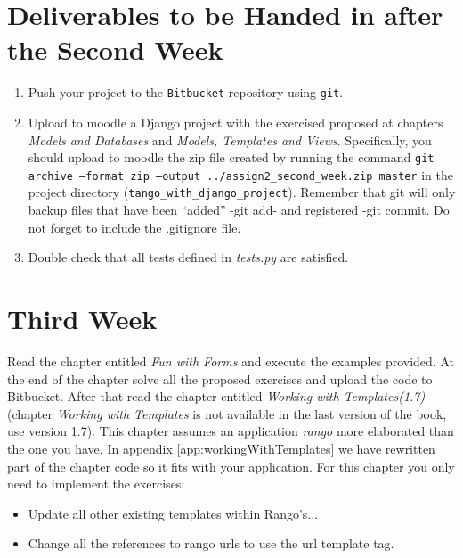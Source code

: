 \documentclass[12pt]{article} %
\newcounter{ejercicioNo}
\begin{document}
\section{Deliverables to be Handed in after the Second Week}

\begin{minipage}{\linewidth}
\begin{framed}
\begin{enumerate}
\item Push your project to the \texttt{Bitbucket} repository using \texttt{git}. 

\item Upload to moodle a Django project with the exercised proposed at chapters \textit{Models and Databases} and  \textit{Models, Templates and Views}. Specifically, you should upload to moodle the  zip file created by running the command \texttt{git archive --format zip --output ../assign2\_second\_week.zip  master} in the project directory (\texttt{tango\_with\_django\_project}). Remember that git will only backup files that have been ``added'' -git add- and registered -git commit. Do not forget to include the .gitignore file.

\item Double check that all tests defined in \textit{tests.py} are satisfied.
\end{enumerate}
\end{framed}
\end{minipage}

\section{Third Week}

Read the chapter entitled \textit{Fun with Forms} and execute the examples provided. At the end of the chapter solve all the proposed exercises and upload the code to Bitbucket. After that read the chapter entitled \textit{Working with Templates(1.7)} (chapter \textit{Working with Templates} is not available in the last version of the book, use version  1.7). This chapter assumes an application  \textit{rango} more elaborated than the one you have. In  appendix \ref{app:workingWithTemplates} we have rewritten part of the chapter code so it fits with your application. For this chapter you only need to implement the exercises:

\begin{itemize}
 \item Update all other existing templates within Rango’s...
 \item Change all the references to rango urls to use the url template tag.
\end{itemize}
\end{document}
